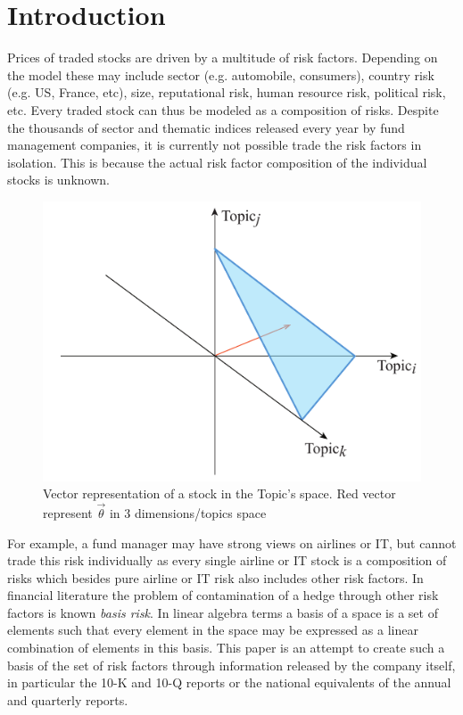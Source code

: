 \documentclass[12pt,journal,letterpaper,oneside,onecolumn]{IEEEtran}
\begin{document}
\section{Introduction}
Prices of traded stocks are driven by a multitude of risk factors. Depending on the model these may include sector (e.g. automobile, consumers), country risk (e.g. US, France, etc), size, reputational risk, human resource risk, political risk, etc.
Every traded stock can thus be modeled as a composition of risks. Despite the thousands of sector and thematic indices released every year by fund management companies, it is currently not possible trade the risk factors in isolation. This is because the actual risk factor composition of the individual stocks is unknown. 
\begin{figure}
    \centering
	\includegraphics[width=0.5\linewidth]{images/vector_representation.pdf}	\caption{Vector representation of a stock in the Topic's space. Red vector represent $\vec{\theta}$ in 3 dimensions/topics space}
	\label{fig:companies-topics-distribution}       
\end{figure}

For example, a fund manager may have strong views on airlines or IT, but cannot trade this risk individually as every single airline or IT stock is a composition of risks which besides pure airline or IT risk also includes other risk factors. 
In financial literature the problem of contamination of a hedge through other risk factors is known \textit{basis risk}.
In linear algebra terms a basis of a space is a set of elements such that every element in the space may be expressed as a linear combination of elements in this basis.
This paper is an attempt to create such a basis of the set of risk factors through information released by the company itself, in particular the 10-K and 10-Q reports or the national equivalents of the annual and quarterly reports.
\end{document}
